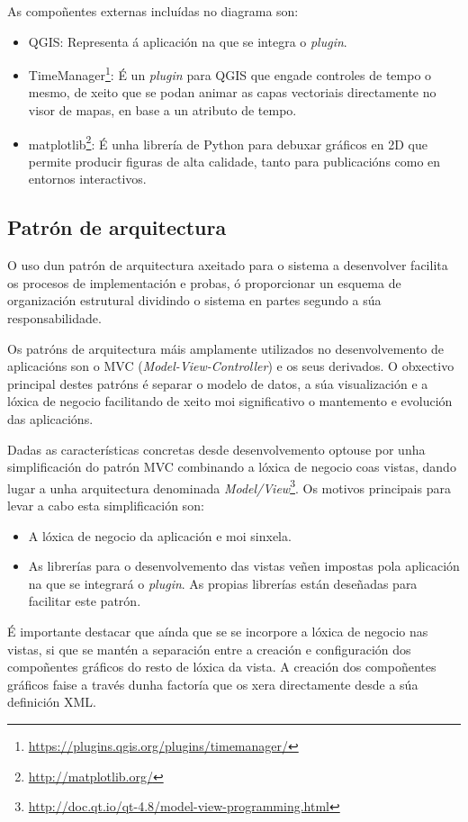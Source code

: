As compoñentes externas incluídas no diagrama son:
\begin{itemize}
\item QGIS: Representa á aplicación na que se integra o \emph{plugin}.
\item TimeManager\footnote{\url{https://plugins.qgis.org/plugins/timemanager/}}: É un \emph{plugin} para QGIS que engade controles de tempo o mesmo, de xeito que se podan animar as capas vectoriais directamente no visor de mapas, en base a un atributo de tempo.
\item matplotlib\footnote{\url{http://matplotlib.org/}}: É unha librería de Python para debuxar gráficos en 2D que permite producir figuras de alta calidade, tanto para publicacións como en entornos interactivos.
\end{itemize}

\subsection{Patrón de arquitectura}
O uso dun patrón de arquitectura axeitado para o sistema a desenvolver facilita os procesos de implementación e probas, ó proporcionar un esquema de organización estrutural dividindo o sistema en partes segundo a súa responsabilidade.

Os patróns de arquitectura máis amplamente utilizados no desenvolvemento de aplicacións son o MVC (\emph{Model-View-Controller}) e os seus derivados. O obxectivo principal destes patróns é separar o modelo de datos, a súa visualización e a lóxica de negocio facilitando de xeito moi significativo o mantemento e evolución das aplicacións.

Dadas as características concretas desde desenvolvemento optouse por unha simplificación do patrón MVC combinando a lóxica de negocio coas vistas, dando lugar a unha arquitectura denominada \emph{Model/View}\footnote{\url{http://doc.qt.io/qt-4.8/model-view-programming.html}}. Os motivos principais para levar a cabo esta simplificación son:
\begin{itemize}
\item A lóxica de negocio da aplicación e moi sinxela.
\item As librerías para o desenvolvemento das vistas veñen impostas pola aplicación na que se integrará o \emph{plugin}. As propias librerías están deseñadas para facilitar este patrón.
\end{itemize}

É importante destacar que aínda que se se incorpore a lóxica de negocio nas vistas, si que se mantén a separación entre a creación e configuración dos compoñentes gráficos do resto de lóxica da vista. A creación dos compoñentes gráficos faise a través dunha factoría que os xera directamente desde a súa definición XML.

